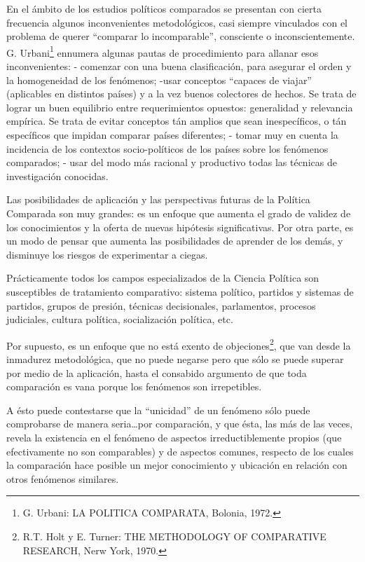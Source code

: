 \documentclass[
]{book}
\begin{document}
En el ámbito de los estudios políticos comparados se presentan con cierta frecuencia algunos inconvenientes metodológicos, casi siempre vinculados con el problema de querer ``comparar lo incomparable'', consciente o inconscientemente. G. Urbani\footnote{G. Urbani: LA POLITICA COMPARATA, Bolonia, 1972.} ennumera algunas pautas de procedimiento para allanar esos inconvenientes: - comenzar con una buena clasificación, para asegurar el orden y la homogeneidad de los fenómenos; -usar conceptos ``capaces de viajar'' (aplicables en distintos países) y a la vez buenos colectores de hechos. Se trata de lograr un buen equilibrio entre requerimientos opuestos: generalidad y relevancia empírica. Se trata de evitar conceptos tán amplios que sean inespecíficos, o tán específicos que impidan comparar países diferentes; - tomar muy en cuenta la incidencia de los contextos socio-políticos de los países sobre los fenómenos comparados; - usar del modo más racional y productivo todas las técnicas de investigación conocidas.

Las posibilidades de aplicación y las perspectivas futuras de la Política Comparada son muy grandes: es un enfoque que aumenta el grado de validez de los conocimientos y la oferta de nuevas hipótesis significativas. Por otra parte, es un modo de pensar que aumenta las posibilidades de aprender de los demás, y disminuye los riesgos de experimentar a ciegas.

Prácticamente todos los campos especializados de la Ciencia Política son susceptibles de tratamiento comparativo: sistema político, partidos y sistemas de partidos, grupos de presión, técnicas decisionales, parlamentos, procesos judiciales, cultura política, socialización política, etc.

Por supuesto, es un enfoque que no está exento de objeciones\footnote{R.T. Holt y E. Turner: THE METHODOLOGY OF COMPARATIVE RESEARCH, Nerw York, 1970.}, que van desde la inmadurez metodológica, que no puede negarse pero que sólo se puede superar por medio de la aplicación, hasta el consabido argumento de que toda comparación es vana porque los fenómenos son irrepetibles.

A ésto puede contestarse que la ``unicidad'' de un fenómeno sólo puede comprobarse de manera seria\ldots por comparación, y que ésta, las más de las veces, revela la existencia en el fenómeno de aspectos irreductiblemente propios (que efectivamente no son comparables) y de aspectos comunes, respecto de los cuales la comparación hace posible un mejor conocimiento y ubicación en relación con otros fenómenos similares.
\end{document}
